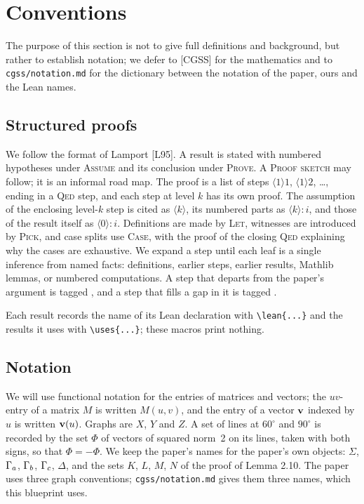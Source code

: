 \section{Conventions}

The purpose of this section is not to give full definitions and background, but rather to
establish notation; we defer to [CGSS] for the mathematics and to \verb|cgss/notation.md| for
the dictionary between the notation of the paper, ours and the Lean names.

\subsection*{Structured proofs}
We follow the format of Lamport [L95]. A result is stated with numbered hypotheses under
\textsc{Assume} and its conclusion under \textsc{Prove}. A \textsc{Proof sketch} may follow; it
is an informal road map. The proof is a list of steps $\langle1\rangle1$, $\langle1\rangle2$,
\dots, ending in a \textsc{Qed} step, and each step at level $k$ has its own proof. The
assumption of the enclosing level-$k$ step is cited as $\langle k\rangle$, its numbered parts as
$\langle k\rangle{:}i$, and those of the result itself as $\langle0\rangle{:}i$. Definitions are
made by \textsc{Let}, witnesses are introduced by \textsc{Pick}, and case splits use
\textsc{Case}, with the proof of the closing \textsc{Qed} explaining why the cases are exhaustive.
We expand a step until each leaf is a single inference from named facts: definitions, earlier
steps, earlier results, Mathlib lemmas, or numbered computations. A step that departs from the
paper's argument is tagged \new, and a step that fills a gap in it is tagged \repair.

Each result records the name of its Lean declaration with \verb|\lean{...}| and the results it
uses with \verb|\uses{...}|; these macros print nothing.

\subsection*{Notation}
We will use functional notation for the entries of matrices and vectors; the $uv$-entry of a
matrix $M$ is written $M(u,v)$, and the entry of a vector ${\mathbf v}$ indexed by $u$ is written
${\mathbf v}(u)$. Graphs are $X$, $Y$ and $Z$. A set of lines at $60^\circ$ and $90^\circ$ is recorded by
the set $\Phi$ of vectors of squared norm~2 on its lines, taken with both signs, so that
$\Phi=-\Phi$. We keep the paper's names for the paper's own objects: $\Sigma$, $\Gamma_a$, $\Gamma_b$,
$\Gamma_c$, $\Delta$, and the sets $K$, $L$, $M$, $N$ of the proof of Lemma 2.10. The paper uses three
graph conventions; \verb|cgss/notation.md| gives them three names, which this blueprint uses.
